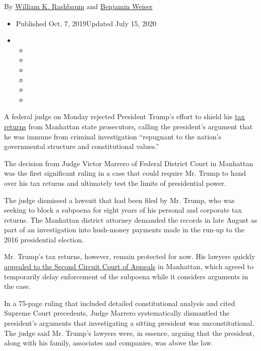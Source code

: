 By
\href{https://www.nytimes3xbfgragh.onion/by/william-k-rashbaum}{William
K. Rashbaum} and
\href{https://www.nytimes3xbfgragh.onion/by/benjamin-weiser}{Benjamin
Weiser}

\begin{itemize}
\item
  Published Oct. 7, 2019Updated July 15, 2020
\item
  \begin{itemize}
  \item
  \item
  \item
  \item
  \item
  \item
  \end{itemize}
\end{itemize}

A federal judge on Monday rejected President Trump's effort to shield
his
\href{https://www.nytimes3xbfgragh.onion/2020/07/15/nyregion/donald-trump-taxes-cyrus-vance.html}{tax
returns} from Manhattan state
prosecutors\href{https://www.nytimes3xbfgragh.onion/2019/09/19/nyregion/trump-tax-returns-lawsuit.html}{,}
calling the president's argument that he was immune from criminal
investigation ``repugnant to the nation's governmental structure and
constitutional values.''

The decision from Judge Victor Marrero of Federal District Court in
Manhattan was the first significant ruling in a case that could require
Mr. Trump to hand over his tax returns and ultimately test the limits of
presidential power.

The judge dismissed a lawsuit that had been filed by Mr. Trump, who was
seeking to block a subpoena for eight years of his personal and
corporate tax returns. The Manhattan district attorney demanded the
records in late August as part of an investigation into hush-money
payments made in the run-up to the 2016 presidential election.

Mr. Trump's tax returns, however, remain protected for now. His lawyers
quickly
\href{https://www.nytimes3xbfgragh.onion/2019/11/04/nyregion/trump-taxes-vance-appeal.html}{appealed
to the Second Circuit Court of Appeals} in Manhattan, which agreed to
temporarily delay enforcement of the subpoena while it considers
arguments in the case.

In a 75-page ruling that included detailed constitutional analysis and
cited Supreme Court precedents, Judge Marrero systematically dismantled
the president's arguments that investigating a sitting president was
unconstitutional. The judge said Mr. Trump's lawyers were, in essence,
arguing that the president, along with his family, associates and
companies, was above the law.

